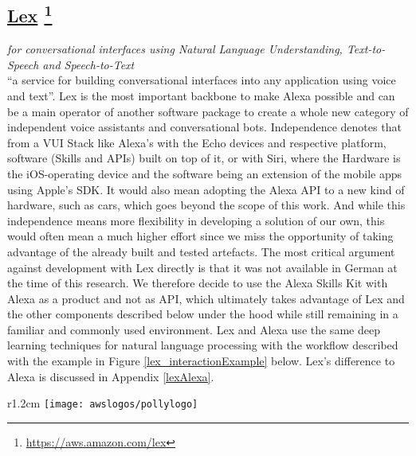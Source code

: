 \subsection*{
	\href{https://aws.amazon.com/lex/}{\textbf{Lex}} \footnote{\url{https://aws.amazon.com/lex}}
}
	\textit{for conversational interfaces using Natural Language Understanding, Text-to-Speech and Speech-to-Text} \\
	``a service for building conversational interfaces into any application using voice and text''\cite{aws_website}.
	Lex is the most important backbone to make Alexa possible and can be a main operator of another software package to create a whole new category of independent voice assistants and conversational bots. Independence denotes that  from a VUI Stack like Alexa's with the Echo devices and respective platform, software (Skills and APIs) built on top of it, or with  Siri, where the Hardware is the iOS-operating device and the software being an extension of the mobile apps using Apple's SDK. It would also mean adopting the Alexa API to a new kind of hardware, such as cars, which goes beyond the scope of this work. And while this independence means more flexibility in developing a solution of our own, this would often mean a much higher effort since we miss the opportunity of taking advantage of the already built and tested artefacts. The most critical argument against development with Lex directly is that it was not available in German at the time of this research. We therefore decide to use the Alexa Skills Kit with Alexa as a product and not as API, which ultimately takes advantage of Lex and the other components described below under the hood while still remaining in a familiar and commonly used environment. Lex and Alexa use the same deep learning techniques for natural language processing with the workflow described with the example in Figure \ref{lex_interactionExample} below. Lex's difference to Alexa  is discussed in Appendix \ref{lexAlexa}.


%	
\begin{wrapfigure}[2]{r}{1.2cm}
		\texttt{[image: awslogos/pollylogo]}
\end{wrapfigure}



